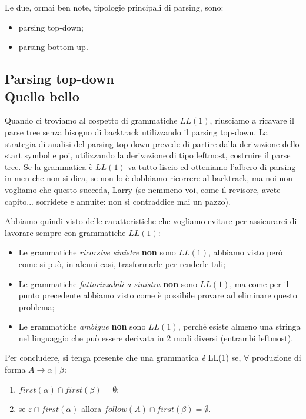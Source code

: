 \documentclass[class=book, crop=false, oneside, 12pt]{standalone}
\begin{document}
Le due, ormai ben note, tipologie principali di parsing, sono:
\begin{itemize}
    \item parsing top-down;
    \item parsing bottom-up.
\end{itemize} 

\subsection{Parsing top-down\\ \small{Quello bello}}
Quando ci troviamo al cospetto di grammatiche \(LL(1)\), riusciamo a ricavare il parse tree senza bisogno di backtrack utilizzando il parsing top-down.
La strategia di analisi del parsing top-down prevede di partire dalla derivazione dello start symbol e poi, utilizzando la derivazione di tipo leftmost, costruire il parse tree.
Se la grammatica è \(LL(1)\) va tutto liscio ed otteniamo l'albero di parsing in men che non si dica, se non lo è dobbiamo ricorrere al backtrack, ma noi non vogliamo che questo succeda, Larry (se nemmeno voi, come il revisore, avete capito... sorridete e annuite: non si contraddice mai un pazzo).

Abbiamo quindi visto delle caratteristiche che vogliamo evitare per assicurarci di lavorare sempre con grammatiche \(LL(1)\):
\begin{itemize}
    \item Le grammatiche \emph{ricorsive sinistre} \textbf{non} sono \(LL(1)\), abbiamo visto però come si può, in alcuni casi, trasformarle per renderle tali;
    \item Le grammatiche \emph{fattorizzabili a sinistra} \textbf{non} sono \(LL(1)\), ma come per il punto precedente abbiamo visto come è possibile provare ad eliminare questo problema;
    \item Le grammatiche \emph{ambigue} \textbf{non} sono \(LL(1)\), perché esiste almeno una stringa nel linguaggio che può essere derivata in 2 modi diversi (entrambi leftmost).
\end{itemize}

Per concludere, si tenga presente che una grammatica \emph{è} LL(1) se, \(\forall\) produzione di forma \(A \to \alpha \mid \beta\):
\begin{enumerate}
    \item \(first(\alpha) \cap first(\beta) = \emptyset\);
    \item se \(\varepsilon \cap first(\alpha)\) allora \(follow(A) \cap first(\beta) = \emptyset\).
\end{enumerate}
\end{document}
